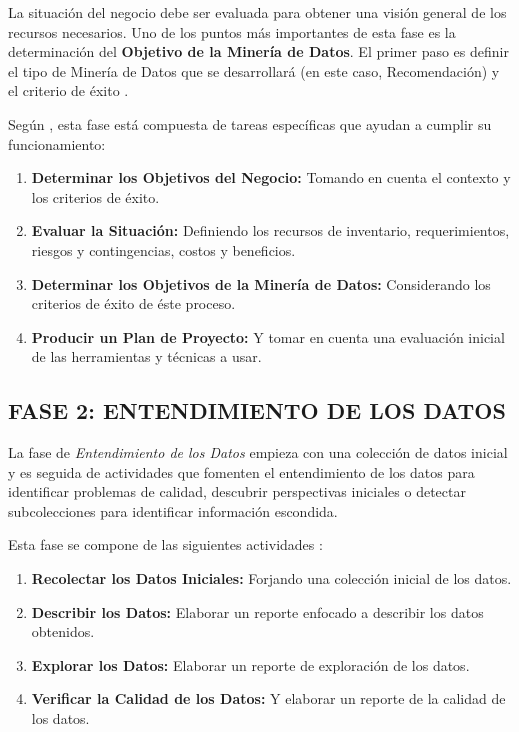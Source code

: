 La situación del negocio debe ser evaluada para obtener una visión general de los recursos necesarios. Uno de los puntos más importantes de esta fase es la determinación del \textbf{Objetivo de la Minería de Datos}. El primer paso es definir el tipo de Minería de Datos que se desarrollará (en este caso, Recomendación) y el criterio de éxito \parencite{schroer2021systematic}. 

Según \parencite{wirth2000crisp}, esta fase está compuesta de tareas específicas que ayudan a cumplir su funcionamiento:

\begin{enumerate}
    \item \textbf{Determinar los Objetivos del Negocio: } Tomando en cuenta el contexto y los criterios de éxito. 
    \item \textbf{Evaluar la Situación:} Definiendo los recursos de inventario, requerimientos, riesgos y contingencias, costos y beneficios.
    \item \textbf{Determinar los Objetivos de la Minería de Datos:} Considerando los criterios de éxito de éste proceso.
    \item \textbf{Producir un Plan de Proyecto:} Y tomar en cuenta una evaluación inicial de las herramientas y técnicas a usar.
\end{enumerate}

\subsection{FASE 2: ENTENDIMIENTO DE LOS DATOS}
La fase de \textit{Entendimiento de los Datos} empieza con una colección de datos inicial y es seguida de actividades que fomenten el entendimiento de los datos para identificar problemas de calidad, descubrir perspectivas iniciales o detectar subcolecciones para identificar información escondida.

Esta fase se compone de las siguientes actividades \parencite{wirth2000crisp}:

\begin{enumerate}
    \item \textbf{Recolectar los Datos Iniciales: } Forjando una colección inicial de los datos.
    \item \textbf{Describir los Datos: } Elaborar un reporte enfocado a describir los datos obtenidos.
    \item \textbf{Explorar los Datos: } Elaborar un reporte de exploración de los datos.
    \item \textbf{Verificar la Calidad de los Datos: } Y elaborar un reporte de la calidad de los datos.
\end{enumerate}


